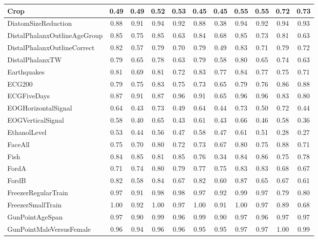 \begin{table}
{\begin{tabular}{lcccccccccc}
        Crop & 0.49 & 0.49 & 0.52 & 0.53 & 0.45 & 0.45 & 0.55 & 0.55 & 0.72 & 0.73 \\ \hline
        DiatomSizeReduction & 0.88 & 0.91 & 0.94 & 0.92 & 0.88 & 0.38 & 0.94 & 0.92 & 0.94 & 0.93 \\ \hline
        DistalPhalanxOutlineAgeGroup & 0.85 & 0.75 & 0.85 & 0.63 & 0.84 & 0.68 & 0.85 & 0.73 & 0.81 & 0.63 \\ \hline
        DistalPhalanxOutlineCorrect & 0.82 & 0.57 & 0.79 & 0.70 & 0.79 & 0.49 & 0.83 & 0.71 & 0.79 & 0.72 \\ \hline
        DistalPhalanxTW & 0.79 & 0.65 & 0.78 & 0.63 & 0.79 & 0.58 & 0.80 & 0.65 & 0.74 & 0.63 \\ \hline
        Earthquakes & 0.81 & 0.69 & 0.81 & 0.72 & 0.83 & 0.77 & 0.84 & 0.77 & 0.75 & 0.71 \\ \hline
        ECG200 & 0.79 & 0.75 & 0.83 & 0.75 & 0.73 & 0.65 & 0.79 & 0.76 & 0.86 & 0.88 \\ \hline
        ECGFiveDays & 0.87 & 0.91 & 0.87 & 0.96 & 0.91 & 0.65 & 0.96 & 0.96 & 0.83 & 0.80 \\ \hline
        EOGHorizontalSignal & 0.64 & 0.43 & 0.73 & 0.49 & 0.64 & 0.44 & 0.73 & 0.50 & 0.72 & 0.44 \\ \hline
        EOGVerticalSignal & 0.58 & 0.40 & 0.65 & 0.43 & 0.61 & 0.43 & 0.66 & 0.46 & 0.58 & 0.36 \\ \hline
        EthanolLevel & 0.53 & 0.44 & 0.56 & 0.47 & 0.58 & 0.47 & 0.61 & 0.51 & 0.28 & 0.27 \\ \hline
        FaceAll & 0.75 & 0.70 & 0.80 & 0.72 & 0.73 & 0.67 & 0.80 & 0.75 & 0.88 & 0.71 \\ \hline
        Fish & 0.84 & 0.85 & 0.81 & 0.85 & 0.76 & 0.34 & 0.84 & 0.86 & 0.75 & 0.78 \\ \hline
        FordA & 0.71 & 0.74 & 0.80 & 0.79 & 0.77 & 0.75 & 0.83 & 0.83 & 0.68 & 0.67 \\ \hline
        FordB & 0.82 & 0.58 & 0.84 & 0.67 & 0.82 & 0.60 & 0.87 & 0.65 & 0.67 & 0.61 \\ \hline
        FreezerRegularTrain & 0.97 & 0.91 & 0.98 & 0.98 & 0.97 & 0.92 & 0.99 & 0.97 & 0.79 & 0.80 \\ \hline
        FreezerSmallTrain & 1.00 & 0.92 & 1.00 & 0.97 & 1.00 & 0.91 & 1.00 & 0.97 & 0.89 & 0.68 \\ \hline
        GunPointAgeSpan & 0.97 & 0.90 & 0.99 & 0.96 & 0.99 & 0.90 & 0.97 & 0.96 & 0.97 & 0.97 \\ \hline
        GunPointMaleVersusFemale & 0.96 & 0.94 & 0.96 & 0.96 & 0.95 & 0.95 & 0.97 & 0.97 & 1.00 & 0.99 \\ \hline

\end{tabular}}
\end{table}
